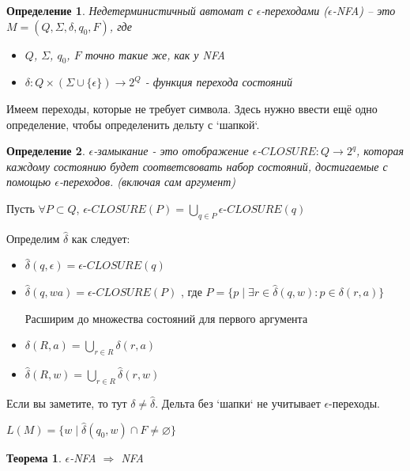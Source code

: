\documentclass[5pt]{article}
\newtheorem{theorem}{Теорема}
\newtheorem{definition}{Определение}
\begin{document}
\begin{definition}
Недетерминистичный автомат с $\epsilon$-переходами ($\epsilon$-NFA) -- это $M = (Q, \Sigma, \delta ,q_0, F)$, где
\begin{itemize}
  \item $Q$, $\Sigma$, $q_0$, $F$ точно такие же, как у NFA
  \item $\delta: Q \times (\Sigma \cup \{\epsilon\}) \rightarrow 2^Q$ - функция перехода состояний
\end{itemize}

\end{definition}

Имеем переходы, которые не требует символа. 
Здесь нужно ввести ещё одно определение, чтобы определенить дельту с `шапкой`.

\begin{definition}
$\epsilon$-замыкание - это отображение $\epsilon$-$CLOSURE: Q \rightarrow 2^q$, которая каждому состоянию будет соответсвовать набор состояний, достигаемые с помощью $\epsilon$-переходов.
(включая сам аргумент)
\end{definition}


Пусть $\forall P \subset Q$, $\epsilon$-$CLOSURE(P) = \bigcup\limits_{q \in P}\epsilon$-$CLOSURE(q)$

Определим $\hat{\delta}$ как следует:
\begin{itemize}
  \item $\hat{\delta}(q, \epsilon) = \epsilon$-$CLOSURE(q)$
  \item $\hat{\delta}(q, wa) = \epsilon$-$CLOSURE(P)$ , где
 $P = \{ p \mid \exists r \in \hat{\delta}(q, w) : p \in \delta(r, a)\}$

Расширим до множества состояний для первого аргумента
  \item $\delta(R, a) = \bigcup\limits_{r \in R}\delta(r, a)$
  \item $\hat{\delta}(R, w) = \bigcup\limits_{r \in R}\hat{\delta}(r, w)$
\end{itemize}

Если вы заметите, то тут $\delta \neq \hat{\delta}$. Дельта без `шапки` не учитывает $\epsilon$-переходы.

$L(M) = \{w \mid \hat{\delta}(q_0,w) \cap F \neq \varnothing\}$
\newpage
\begin{theorem}
$\epsilon$-NFA $\Rightarrow$ NFA
\end{theorem}
\end{document}
